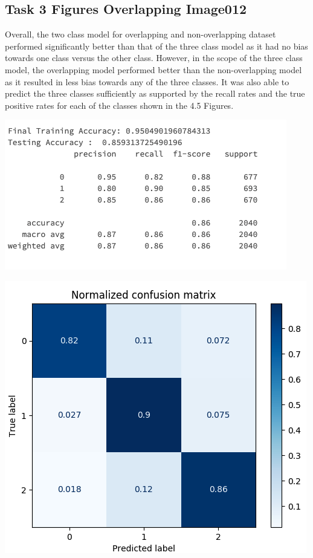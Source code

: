 \documentclass[12pt]{article}
\begin{document}
\begin{multicols*}{2}
  \subsection{Task 3 Figures Overlapping Image012}


  \hspace*{5mm} Overall, the two class model for overlapping and non-overlapping dataset performed significantly better than that of the three class model as it had no bias
  towards one class versus the other class. However, in the scope of the three class model, the overlapping model performed better than the non-overlapping model as it resulted in less
  bias towards any of the three classes. It was also able to predict the three classes sufficiently as supported by the recall rates and the true positive rates for each of the classes shown in the 4.5 Figures.  

  \begin{center}
	\includegraphics[scale=0.4]{../screenshot/Overlapping/score012.png}

	\includegraphics[scale=0.4]{../screenshot/Overlapping/cf012.png}


\end{center}
\end{multicols*}
\end{document}
